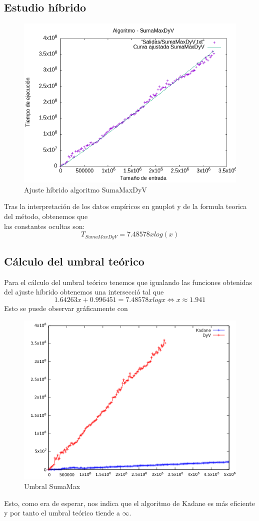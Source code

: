\documentclass[11pt,openany]{book}
\begin{document}
\subsection{Estudio híbrido}
\begin{center}
      \begin{figure}[H]
            \centering
            \includegraphics[width=0.7\linewidth]{assets/Img/SumaMaxDyV_hib.png}
            \caption{Ajuste híbrido algoritmo SumaMaxDyV}
            \label{fig:sumaMax}
      \end{figure}
\end{center}
Tras la interpretación de los datos empíricos en gnuplot y de la formula teorica del método, obtenemos que \\
las constantes ocultas son:
\begin{equation*}
      T_{SumaMaxDyV}=7.48578x log(x)
\end{equation*}
\subsection{Cálculo del umbral teórico}
Para el cálculo del umbral teórico tenemos que igualando las funciones obtenidas del ajuste híbrido obtenemos
una intersecció tal que
\begin{equation*}
      1.64263x+0.996451=7.48578xlog x \Leftrightarrow x \approx 1.941
\end{equation*}
Esto se puede observar gráficamente con
\begin{center}
      \begin{figure}[H]
            \centering
            \includegraphics[width=0.7\linewidth]{assets/Img/SumaMax_Umbral.png}
            \caption{Umbral SumaMax}
            \label{fig:Umbral}
      \end{figure}
\end{center}
Esto, como era de esperar, nos indica que el algoritmo de Kadane es más eficiente
y por tanto el umbral teórico tiende a $\infty$.
\end{document}
